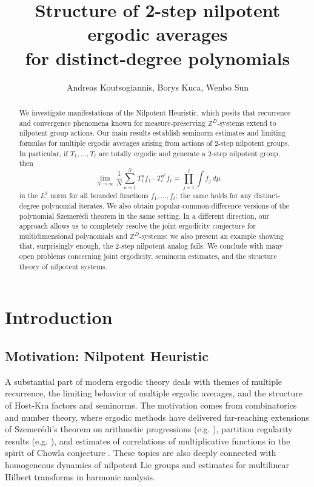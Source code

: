 \documentclass[11pt]{amsart}
\title[]{Structure of 2-step nilpotent ergodic averages\\
for distinct-degree polynomials}
\author{Andreas Koutsogiannis, Borys Kuca, Wenbo Sun}
\date{}
\theoremstyle{definition}
\newcommand{\1}{{\mathbf{1}}}
\begin{document}
\begin{abstract}
    We investigate manifestations of the Nilpotent Heuristic, which posits that recurrence and convergence phenomena known for measure-preserving $\mathbb{Z}^D$-systems extend to nilpotent group actions. Our main results establish seminorm estimates and limiting formulas for multiple ergodic averages arising from actions of 2-step nilpotent groups. In particular, if $T_1,\ldots,T_\ell$ are totally ergodic and generate a 2-step nilpotent group, then
\[
\lim_{N\to\infty}\frac{1}{N}\sum_{n=1}^N T_1^n f_1 \cdots T_\ell^{n^\ell}f_\ell
= \prod_{j=1}^{\ell}\int f_j\,d\mu
\]
in the $L^{2}$ norm for all bounded functions $f_{1},\dots,f_{\ell}$; the same holds for any distinct-degree polynomial iterates. We also obtain popular-common-difference versions of the polynomial Szemer\'edi theorem in the same setting.
In a different direction, our approach allows us to completely resolve the joint ergodicity conjecture for multidimensional polynomials and $\mathbb Z^D$-systems; we also present an example showing that, surprisingly enough, the 2-step nilpotent analog fails. 
We conclude with many open problems concerning joint ergodicity, seminorm estimates, and the structure theory of nilpotent systems.
\end{abstract}

\maketitle



\tableofcontents 

\section{Introduction}

\subsection{Motivation: Nilpotent Heuristic}

A substantial part of modern ergodic theory deals with themes of multiple recurrence, the limiting behavior of multiple ergodic averages, and the structure of Host-Kra factors and seminorms. The motivation comes from combinatorics and number theory, where ergodic methods have delivered far-reaching extensions of Szemer\'edi's theorem on arithmetic progressions (e.g. \cite{BL96, Fu77, FuKa78, KMRR26}), partition regularity results (e.g. \cite{FH17, FKM25, Mo17}), and estimates of correlations of multiplicative functions in the spirit of Chowla conjecture \cite{FH18}. These topics are also deeply connected with homogeneous dynamics of nilpotent Lie groups and estimates for multilinear Hilbert transforms in harmonic analysis. %
\end{document}
